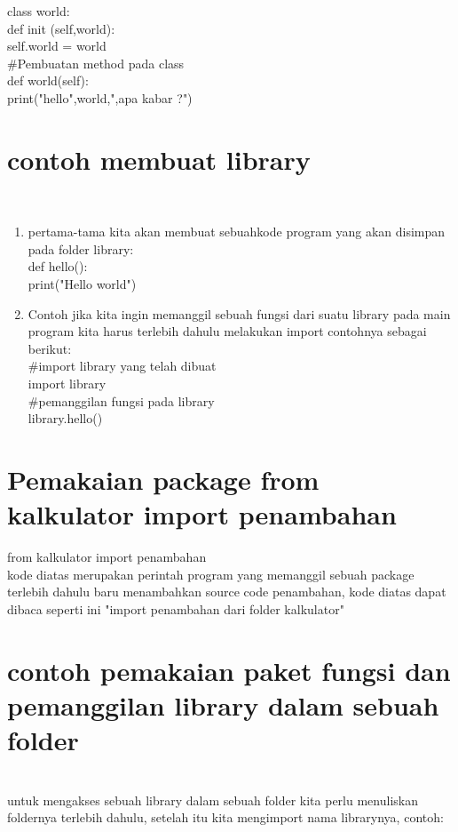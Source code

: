 class world:\\
    def init (self,world):\\
        self.world = world\\
    #Pembuatan method pada class\\
    def world(self):\\
       	print("hello",world,",apa kabar ?")\\
			
			
			
	\section{contoh membuat library}\\
	\begin{enumerate}
	    \item 	pertama-tama kita akan membuat sebuahkode program yang akan disimpan pada folder library:\\
			
def hello():\\
    print("Hello world")\\
			
		\item  Contoh jika kita ingin memanggil sebuah fungsi dari suatu library pada main program kita harus terlebih dahulu melakukan import contohnya sebagai berikut:\\
			
#import library yang telah dibuat\\
import library\\
#pemanggilan fungsi pada library\\
library.hello()\\
	
	\end{enumerate}
	\section{Pemakaian package from kalkulator import penambahan}
			
from kalkulator import penambahan\\
			
kode diatas merupakan perintah program yang memanggil sebuah package terlebih dahulu baru menambahkan source code penambahan, kode diatas dapat dibaca seperti ini "import penambahan dari folder kalkulator"

	\section{ contoh pemakaian paket fungsi dan pemanggilan library dalam sebuah folder}\\
			untuk mengakses sebuah library dalam sebuah folder kita perlu menuliskan foldernya terlebih dahulu, setelah itu kita mengimport nama librarynya, contoh:\\
			
